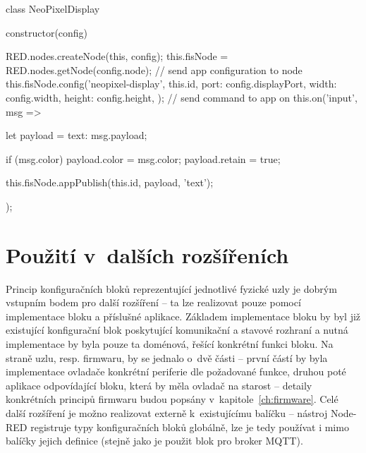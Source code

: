 \begin{code}[
    language=Javascript,
    label=code:fis-node-neopixel-display,
    caption={Implementace bloku pro aplikaci ovládající bodový displej -- kromě samotné konfigurace na cílovém uzlu
    si uzel zaregistruje funkci pro odběr události typu \ic{\'input\'}.
    Událost tohoto typu notifikuje blok o~příchozí zprávě, která je v~tomto případě odeslána do aplikace k~zobrazení
    na displeji.}
]
class NeoPixelDisplay {
    constructor(config) {
        RED.nodes.createNode(this, config);
        this.fisNode = RED.nodes.getNode(config.node);
        // send app configuration to node
        this.fisNode.config('neopixel-display', this.id, {
            port: config.displayPort,
            width: config.width,
            height: config.height,
        });
        // send command to app on
        this.on('input', msg => {
            let payload = {text: msg.payload};

            if (msg.color)
                payload.color = msg.color;
            payload.retain = true;

            this.fisNode.appPublish(this.id, payload, 'text');
        });
    }
}
\end{code}

\section*{Použití v~dalších rozšířeních}\label{sec:pouziti-v-dalsich-rozsirenich}
Princip konfiguračních bloků reprezentující jednotlivé fyzické uzly je dobrým vstupním bodem pro další rozšíření --
ta lze realizovat pouze pomocí implementace bloku a příslušné aplikace.
Základem implementace bloku by byl již existující konfigurační blok poskytující komunikační a stavové rozhraní a
nutná implementace by byla pouze ta doménová, řešící konkrétní funkci bloku.
Na straně uzlu, resp. firmwaru, by se jednalo o~dvě části -- první částí by byla implementace ovladače konkrétní
periferie dle požadované funkce, druhou poté aplikace odpovídající bloku, která by měla ovladač na starost -- detaily
konkrétních principů firmwaru budou popsány v~kapitole~\ref{ch:firmware}.
Celé další rozšíření je možno realizovat externě k~existujícímu balíčku -- nástroj Node-RED
registruje typy konfiguračních bloků globálně, lze je tedy používat i mimo balíčky jejich definice (stejně jako je
použit blok pro
broker MQTT).